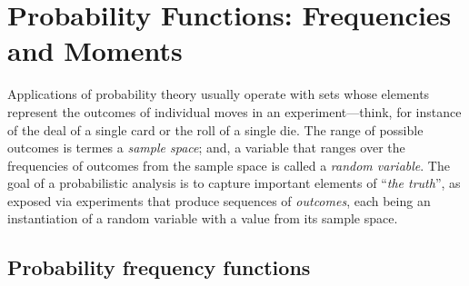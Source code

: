 \section{Probability Functions: Frequencies and Moments}
\label{sec:prob-distributions}
\label{sec:prob-freq-fns+measures}

 

Applications of probability theory usually operate with sets whose
elements represent the outcomes of individual moves in an
experiment---think, for instance of the deal of a single card or the
roll of a single die.  The range of possible outcomes is termes a {\it
  sample space}; and, a variable that ranges over the frequencies of
outcomes from the sample space is called a {\it random variable}.  The
goal of a probabilistic analysis is to capture important elements of
``{\em the truth}'', as exposed via experiments that produce sequences
of {\em outcomes}, each being an instantiation of a random variable
with a value from its sample space.

\subsection{Probability frequency functions}
\label{sec:prob-freq-fns}


